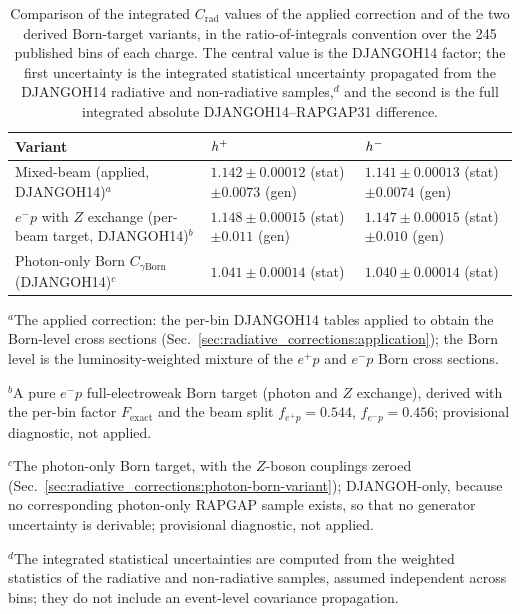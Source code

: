 \begin{table}[h]
\centering
\small
\begin{tabular}{p{4.6cm}p{5.2cm}p{5.2cm}}
\toprule
Variant & $h^{+}$ & $h^{-}$ \\
\midrule
Mixed-beam (applied, DJANGOH14)$^{a}$ &
  $1.142 \pm 0.00012$ (stat) $\pm 0.0073$ (gen) &
  $1.141 \pm 0.00013$ (stat) $\pm 0.0074$ (gen) \\
$e^{-}p$ with $Z$ exchange (per-beam target, DJANGOH14)$^{b}$ &
  $1.148 \pm 0.00015$ (stat) $\pm 0.011$ (gen) &
  $1.147 \pm 0.00015$ (stat) $\pm 0.010$ (gen) \\
Photon-only Born $C_{\gamma\mathrm{Born}}$ (DJANGOH14)$^{c}$ &
  $1.041 \pm 0.00014$ (stat) &
  $1.040 \pm 0.00014$ (stat) \\
\bottomrule
\end{tabular}

{\footnotesize
$^{a}$The applied correction: the per-bin DJANGOH14 tables applied to obtain
the Born-level cross sections
(Sec.~\ref{sec:radiative_corrections:application}); the
Born level is the luminosity-weighted mixture of the $e^{+}p$ and $e^{-}p$
Born cross sections.

\smallskip
$^{b}$A pure $e^{-}p$ full-electroweak Born target (photon and $Z$
exchange), derived with the per-bin factor $F_{\mathrm{exact}}$ and the beam
split $f_{e^{+}p} = 0.544$, $f_{e^{-}p} = 0.456$; provisional diagnostic, not
applied.

\smallskip
$^{c}$The photon-only Born target, with the $Z$-boson couplings zeroed
(Sec.~\ref{sec:radiative_corrections:photon-born-variant}); DJANGOH-only,
because no corresponding photon-only RAPGAP sample exists, so that no
generator uncertainty is derivable; provisional diagnostic, not applied.

\smallskip
$^{d}$The integrated statistical uncertainties are computed from the
weighted statistics of the radiative and non-radiative samples, assumed
independent across bins; they do not include an event-level covariance
propagation.
\par}

\caption{Comparison of the integrated $C_{\mathrm{rad}}$ values of the
applied correction and of the two derived Born-target variants, in the
ratio-of-integrals convention over the 245 published bins of each charge.
The central value is the DJANGOH14 factor; the first uncertainty is the
integrated statistical uncertainty propagated from the DJANGOH14
radiative and non-radiative samples,$^{d}$ and the second is the full integrated absolute
DJANGOH14--RAPGAP31 difference.}
\label{tab:crad:integrated-variants}
\end{table}

